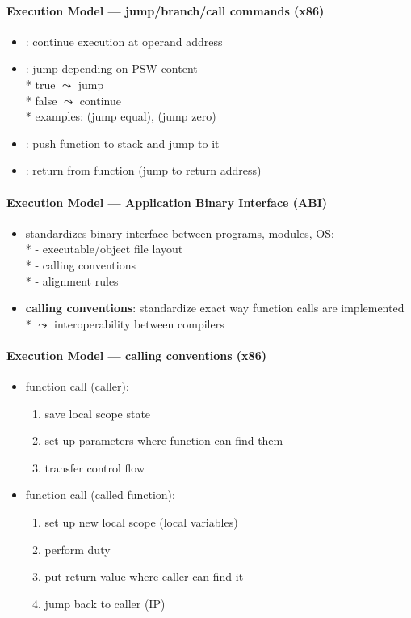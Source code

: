 \paragraph{Execution Model --- jump/branch/call commands (x86)}
\begin{itemize}
  \item {}: continue execution at operand address
  \item {}: jump depending on PSW content \\*
    true \( \leadsto \) jump \\*
    false \( \leadsto \) continue \\*
    examples:  (jump equal),  (jump zero)
  \item {}: push function to stack and jump to it
  \item {}: return from function (jump to return address)
\end{itemize}

\paragraph{Execution Model --- Application Binary Interface (ABI)}
\begin{itemize}
  \item standardizes binary interface between programs, modules, OS: \\*
    - executable/object file layout \\*
    - calling conventions \\*
    - alignment rules
  \item \textbf{calling conventions}: standardize exact way function calls are implemented \\*
    \( \leadsto \) interoperability between compilers
\end{itemize}

\paragraph{Execution Model --- calling conventions (x86)}
\begin{itemize}
  \item function call (caller):
  \begin{enumerate}
    \item save local scope state 
    \item set up parameters where function can find them
    \item transfer control flow
  \end{enumerate}
  \item function call (called function):
  \begin{enumerate}
    \item set up new local scope (local variables)
    \item perform duty
    \item put return value where caller can find it
    \item jump back to caller (IP)
  \end{enumerate}
\end{itemize}

